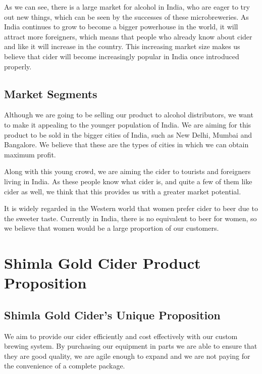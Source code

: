 \documentclass[11pt]{article}
\begin{document}
As we can see, there is a large market for alcohol in India, who are eager to try out new things, which can be seen by the successes of these microbreweries. As India continues to grow to become a bigger powerhouse in the world, it will attract more foreigners, which means that people who already know about cider and like it will increase in the country. This increasing market size makes us believe that cider will become increasingly popular in India once introduced properly.

  \subsection{Market Segments}
Although we are going to be selling our product to alcohol distributors, we want
to make it appealing to the younger population of India. We are aiming for this
product to be sold in the bigger cities of India, such as New Delhi, Mumbai and
Bangalore. We believe that these are the types of cities in which we can
obtain maximum profit.

Along with this young crowd, we are aiming the cider to tourists and foreigners
living in India. As these people know what cider is, and quite a few of them
like cider as well, we think that this provides us with a greater market
potential.

It is widely regarded in the Western world that women prefer cider to beer due
to the sweeter taste. Currently in India, there is no equivalent to beer for
women, so we believe that women would be a large proportion of our customers.

\newpage
\section{Shimla Gold Cider Product Proposition}

\subsection{Shimla Gold Cider's Unique Proposition}
We aim to provide our cider efficiently and cost effectively with our custom
brewing system. By purchasing our equipment in parts we are able to ensure that
they are good quality, we are agile enough to expand and we are not paying for
the convenience of a complete package.
\end{document}
